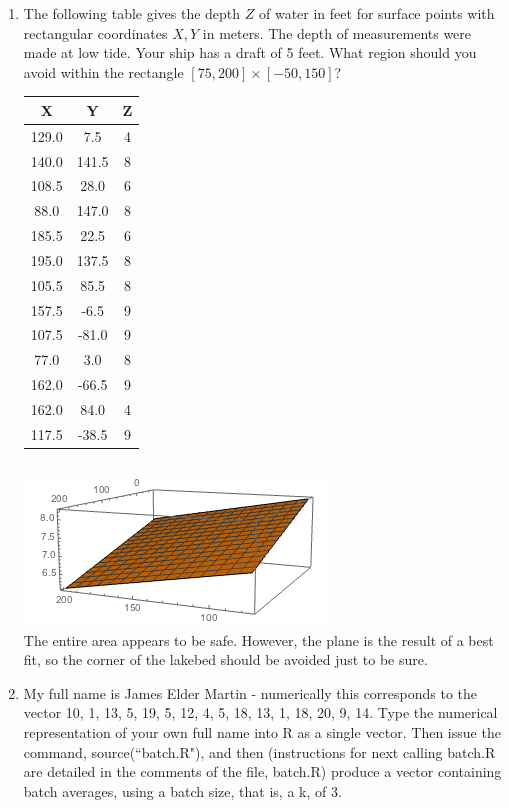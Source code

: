 \documentclass{hw}
\begin{document}
\begin{enumerate}
\begin{quote}
\begin{minipage}{0.5\textwidth}
\end{minipage}
\end{quote}

\newpage
\item The following table gives the depth $Z$ of water in feet for surface points with rectangular
coordinates $X, Y$ in meters. The depth of measurements were made at low tide. Your ship has a draft of 5
feet. What region should you avoid within the rectangle $[75, 200] \times [-50, 150]$?
\begin{center}
\begin{tabular}{c | c | c}
X & Y & Z\\
\hline
129.0 & 7.5 & 4\\
140.0 & 141.5 & 8\\
108.5 & 28.0 & 6\\
88.0 & 147.0 & 8\\
185.5 & 22.5 & 6\\
195.0 & 137.5 & 8\\
105.5 & 85.5 & 8\\
157.5 & -6.5 & 9\\
107.5 & -81.0 & 9\\
77.0 & 3.0 & 8\\
162.0 & -66.5 & 9\\
162.0 & 84.0 & 4\\
117.5 & -38.5 & 9
\end{tabular}
\end{center}

\inputminted{r}{lakebedr.R}
\includegraphics[scale=0.7]{three_plot}
\noindent\\
The entire area appears to be safe. However, the plane is the result of a best fit, so the corner
of the lakebed should be avoided just to be sure.

\newpage
\item My full name is James Elder Martin - numerically this corresponds to the vector 10, 1, 13, 5,
19, 5, 12, 4, 5, 18, 13, 1, 18, 20, 9, 14. Type the numerical representation of your own full name
into R as a single vector. Then issue the command, source(``batch.R"), and then (instructions for
next calling batch.R are detailed in the comments of the file, batch.R) produce a vector containing
batch averages, using a batch size, that is, a k, of 3.
\begin{quote}
\inputminted{r}{num_three.R}
\end{quote}
\end{enumerate}
\end{document}
